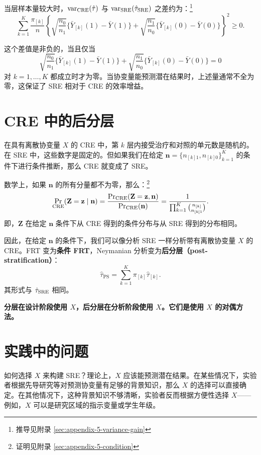 当层样本量较大时，$\text{var}_{\text{CRE}}(\hat\tau)$ 与 $\text{var}_{\text{SRE}}(\hat\tau_{\text{SRE}})$ 之差约为：\footnote{推导见附录 \cref{sec:appendix-5-variance-gain}}
\[
\sum_{k=1}^K \frac{\pi_{[k]}}{n} \left\{ \sqrt{\frac{n_0}{n_1}} \{\bar Y_{[k]}(1) - \bar Y(1)\} + \sqrt{\frac{n_1}{n_0}} \{\bar Y_{[k]}(0) - \bar Y(0)\} \right\}^2 \geq 0 .
\label{eq:5-variance-gain}
\]

这个差值是非负的，当且仅当
\[
\sqrt{\frac{n_0}{n_1}} \{\bar Y_{[k]}(1) - \bar Y(1)\} + \sqrt{\frac{n_1}{n_0}} \{\bar Y_{[k]}(0) - \bar Y(0)\} = 0
\]
对 $k = 1, \dots, K$ 都成立时才为零。当协变量能预测潜在结果时，上述量通常不全为零，这保证了 SRE 相对于 CRE 的效率增益。

\section{CRE 中的后分层}\label{sec:5-post-stratification}

在具有离散协变量 $X$ 的 CRE 中，第 $k$ 层内接受治疗和对照的单元数是随机的。在 SRE 中，这些数字是固定的。但如果我们在给定 $\mathbf{n} = \{n_{[k]1}, n_{[k]0}\}_{k=1}^K$ 的条件下进行条件推断，那么 CRE 就变成了 SRE。

数学上，如果 $\mathbf{n}$ 的所有分量都不为零，那么：\footnote{证明见附录 \cref{sec:appendix-5-condition}}
\[
\Pr_{\text{CRE}}(\mathbf{Z} = \mathbf{z} \mid \mathbf{n}) = \frac{\Pr_{\text{CRE}}(\mathbf{Z} = \mathbf{z}, \mathbf{n})}{\Pr_{\text{CRE}}(\mathbf{n})} = \frac{1}{\prod_{k=1}^K \binom{n_{[k]}}{n_{[k]1}}} .
\label{eq:5-condition-dist}
\]
即，$\mathbf{Z}$ 在给定 $\mathbf{n}$ 条件下从 CRE 得到的条件分布与从 SRE 得到的分布相同。

因此，在给定 $\mathbf{n}$ 的条件下，我们可以像分析 SRE 一样分析带有离散协变量 $X$ 的 CRE。FRT 变为\textbf{条件 FRT}，Neymanian 分析变为\textbf{后分层（post-stratification）}：
\[
\hat\tau_{\text{PS}} = \sum_{k=1}^K \pi_{[k]} \hat\tau_{[k]} .
\label{eq:5-post-strat-estimator}
\]
其形式与 $\hat\tau_{\text{SRE}}$ 相同。

\textbf{分层在设计阶段使用 $X$，后分层在分析阶段使用 $X$。它们是使用 $X$ 的对偶方法。}

\section{实践中的问题}\label{sec:5-practice}

如何选择 $X$ 来构建 SRE？理论上，$X$ 应该能预测潜在结果。在某些情况下，实验者根据先导研究等对预测协变量有足够的背景知识，那么 $X$ 的选择可以直接确定。在其他情况下，这种背景知识不够清晰，实验者反而根据方便性选择 $X$——例如，$X$ 可以是研究区域的指示变量或学生年级。

